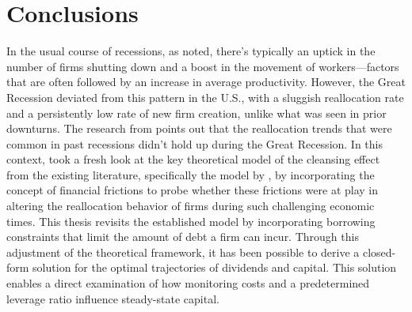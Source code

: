 \chapter{Conclusions}

In the usual course of recessions, as \cite{DavHalt92} noted, there's typically an uptick in the number of firms
shutting down and a boost in the movement of workers—factors that are often followed by an increase in average
productivity. However, the Great Recession deviated from this pattern in the U.S., with a sluggish reallocation rate and
a persistently low rate of new firm creation, unlike what was seen in prior downturns. The research from \cite{FosHal16}
points out that the reallocation trends that were common in past recessions didn't hold up during the Great Recession.
In this context, \cite{OsePap17} took a fresh look at the key theoretical model of the cleansing effect from the
existing literature, specifically the model by \cite{CabHarm94}, by incorporating the concept of financial frictions to
probe whether these frictions were at play in altering the reallocation behavior of firms during such challenging
economic times. 
% 
This thesis revisits the established model by incorporating borrowing constraints that limit the amount of debt a firm
can incur. Through this adjustment of the theoretical framework, it has been possible to derive a closed-form solution
for the optimal trajectories of dividends and capital. This solution enables a direct examination of how monitoring
costs and a predetermined leverage ratio influence steady-state capital. 

